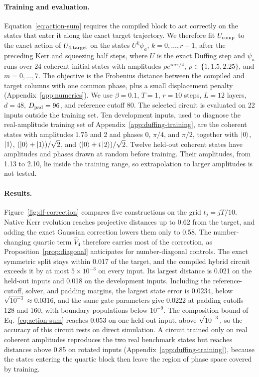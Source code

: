 \documentclass[pra,twocolumn,superscriptaddress,nofootinbib,floatfix]{revtex4-2}
\theoremstyle{remark}
\newcommand{\revcolor}{\color{blue}}
\DeclareRobustCommand{\rev}[1]{{\revcolor #1}}
\begin{document}
\paragraph{\rev{Training and evaluation.}}
\rev{Equation~\eqref{eq:action-sum} requires the compiled block to act correctly on the states that enter it along the exact target trajectory.} \rev{We therefore fit \(U_{\rm comp}\) to the exact action of \(U_{4,\rm target}\) on the states \(U^k\psi_a\), \(k=0,\ldots,r-1\), after the preceding Kerr and squeezing half steps, where \(U\) is the exact Duffing step and \(\psi_a\) runs over 24 coherent initial states with amplitudes \(\rho e^{im\pi/4}\), \(\rho\in\{1,1.5,2.25\}\), and \(m=0,\ldots,7\).} \rev{The objective is the Frobenius distance between the compiled and target columns with one common phase, plus a small displacement penalty (Appendix~\ref{app:numerics}).} \rev{We use \(\beta=0.1\), \(T=1\), \(r=10\) steps, \(L=12\) layers, \(d=48\), \(D_{\rm pad}=96\), and reference cutoff 80.} \rev{The selected circuit is evaluated on 22 inputs outside the training set.} \rev{Ten development inputs, used to diagnose the real-amplitude training set of Appendix~\ref{app:duffing-training}, are the coherent states with amplitudes \(1.75\) and 2 and phases 0, \(\pi/4\), and \(\pi/2\), together with \(\ket0\), \(\ket1\), \((\ket0+\ket1)/\sqrt2\), and \((\ket0+i\ket2)/\sqrt2\).} \rev{Twelve held-out coherent states have amplitudes and phases drawn at random before training.} \rev{Their amplitudes, from 1.13 to 2.10, lie inside the training range, so extrapolation to larger amplitudes is not tested.}

\paragraph{Results.}
\rev{Figure~\ref{fig:df-correction} compares five constructions on the grid \(t_j=jT/10\).} \rev{Native Kerr evolution reaches projective distances up to 0.62 from the target, and adding the exact Gaussian correction lowers them only to 0.58.} \rev{The number-changing quartic term \(\hat V_4\) therefore carries most of the correction, as Proposition~\ref{prop:diagonal} anticipates for number-diagonal controls.} \rev{The exact symmetric split stays within 0.017 of the target, and the compiled hybrid circuit exceeds it by at most \(5\times10^{-3}\) on every input.} \rev{Its largest distance is 0.021 on the held-out inputs and 0.018 on the development inputs.} \rev{Including the reference-cutoff, solver, and padding margins, the largest state error is \(0.0234\), below \(\sqrt{10^{-3}}\approx0.0316\), and the same gate parameters give 0.0222 at padding cutoffs 128 and 160, with boundary populations below \(10^{-9}\).} \rev{The composition bound of Eq.~\eqref{eq:action-sum} reaches 0.053 on one held-out input, above \(\sqrt{10^{-3}}\), so the accuracy of this circuit rests on direct simulation.} \rev{A circuit trained only on real coherent amplitudes reproduces the two real benchmark states but reaches distances above 0.85 on rotated inputs (Appendix~\ref{app:duffing-training}), because the states entering the quartic block then leave the region of phase space covered by training.}
\end{document}
